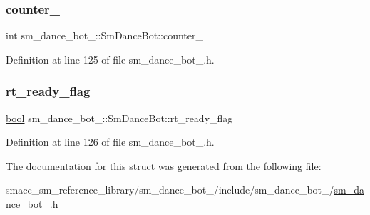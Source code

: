 \subsubsection{\texorpdfstring{counter\+\_}{counter\_1}}
{\footnotesize\ttfamily int sm\+\_\+dance\+\_\+bot\+\_\+::\+Sm\+Dance\+Bot\+::counter\+\_}



Definition at line 125 of file sm\+\_\+dance\+\_\+bot\+\_.\+h.

\mbox{\label{structsm__dance__bot__2_1_1SmDanceBot_a9929548acc196867c0c368cdd778ea76}} 
\subsubsection{\texorpdfstring{rt\+\_\+ready\+\_\+flag}{rt\_ready\_flag}}
{\footnotesize\ttfamily \hyperlink{classbool}{bool} sm\+\_\+dance\+\_\+bot\+\_\+::\+Sm\+Dance\+Bot\+::rt\+\_\+ready\+\_\+flag}



Definition at line 126 of file sm\+\_\+dance\+\_\+bot\+\_.\+h.



The documentation for this struct was generated from the following file\+:\begin{DoxyCompactItemize}
\item 
smacc\+\_\+sm\+\_\+reference\+\_\+library/sm\+\_\+dance\+\_\+bot\+\_/include/sm\+\_\+dance\+\_\+bot\+\_/\hyperlink{sm__dance__bot__2_8h}{sm\+\_\+dance\+\_\+bot\+\_.\+h}\end{DoxyCompactItemize}
